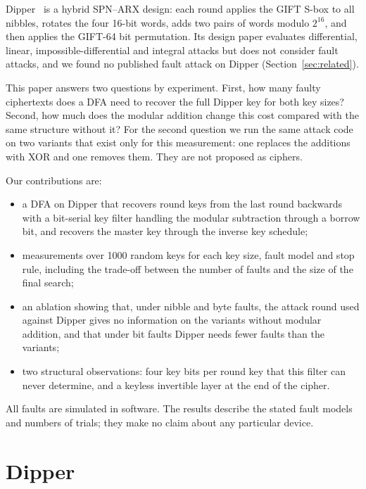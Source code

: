 \documentclass[11pt,a4paper]{article}
\begin{document}
Dipper~\cite{Dipper2026} is a hybrid SPN--ARX design: each round applies the GIFT S-box to
all nibbles, rotates the four 16-bit words, adds two pairs of words modulo $2^{16}$, and then
applies the GIFT-64 bit permutation. Its design paper evaluates differential, linear,
impossible-differential and integral attacks but does not consider fault attacks, and we
found no published fault attack on Dipper (Section~\ref{sec:related}).

This paper answers two questions by experiment. First, how many faulty ciphertexts does a
DFA need to recover the full Dipper key for both key sizes? Second, how much does the
modular addition change this cost compared with the same structure without it? For the second
question we run the same attack code on two variants that exist only for this measurement: one
replaces the additions with XOR and one removes them. They are not proposed as ciphers.

Our contributions are:
\begin{itemize}
\item a DFA on Dipper that recovers round keys from the last round backwards with a
bit-serial key filter handling the modular subtraction through a borrow bit, and recovers the
master key through the inverse key schedule;
\item measurements over 1000 random keys for each key size, fault model and stop rule,
including the trade-off between the number of faults and the size of the final search;
\item an ablation showing that, under nibble and byte faults, the attack round used against
Dipper gives no information on the variants without modular addition, and that under bit
faults Dipper needs fewer faults than the variants;
\item two structural observations: four key bits per round key that this filter can never
determine, and a keyless invertible layer at the end of the cipher.
\end{itemize}
All faults are simulated in software. The results describe the stated fault models and
numbers of trials; they make no claim about any particular device.

\section{Dipper}\label{sec:dipper}
\end{document}
